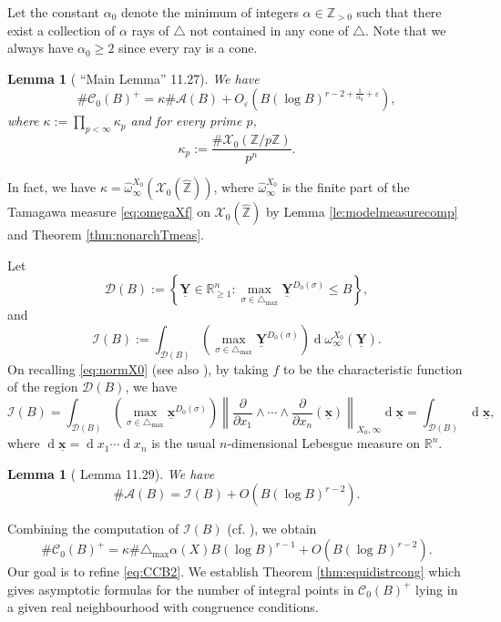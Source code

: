 \documentclass[11pt,letterpaper]{amsart}
\newcommand{\BR}{{\mathbb {R}}}
\newcommand{\BZ}{{\mathbb {Z}}}
\newcommand{\CA}{{\mathcal {A}}}
\newcommand{\CC}{{\mathcal {C}}}
\newcommand{\CD}{{\mathcal {D}}}
\newcommand{\CI}{{\mathcal {I}}}
\newcommand{\CX}{{\mathcal {X}}}
\newcommand{\xx}{\underline{\mathbf{x}}}
\newcommand{\YY}{\underline{\mathbf{Y}}}
\theoremstyle{plain}
\numberwithin{equation}{section}
\newtheorem{lemma}[theorem]{Lemma}
\theoremstyle{definition}
\theoremstyle{remark}
\begin{document}
Let the constant $\alpha_0$ denote the minimum of integers $\alpha\in\BZ_{>0}$ such that there exist a collection of $\alpha$ rays of $\triangle$ not contained in any cone of $\triangle$. Note that we always have $\alpha_0\geqslant 2$ since every ray is a cone.
\begin{lemma}[\cite{Salberger} ``Main Lemma'' 11.27]\label{thm:Salbergermainlemma} We have
$$\#\CC_0(B)^+=\kappa\#\CA(B)+O_\varepsilon(B(\log B)^{r-2+\frac{1}{\alpha_0}+\varepsilon}),$$ where $\kappa:=\prod_{p<\infty}\kappa_p$ and for every prime $p$, \begin{equation}\label{eq:kappa}
	\kappa_p:=\frac{\#\CX_0(\BZ/p\BZ)}{p^n}.
\end{equation} 
\end{lemma}
In fact, we have $\kappa=\widehat{\omega}_{\infty}^{X_0}(\CX_0(\widehat{\BZ}))$, where $\widehat{\omega}_{\infty}^{X_0}$ is the finite part of the Tamagawa measure \eqref{eq:omegaXf} on $\CX_0(\widehat{\BZ})$ by Lemma \ref{le:modelmeasurecomp} and Theorem \ref{thm:nonarchTmeas}.

Let
\begin{equation}\label{eq:CDB}
	\CD(B):=\left\{\YY\in\BR_{\geqslant 1}^n:\max_{\sigma\in\triangle_{\max}}\YY^{D_0(\sigma)}\leqslant B\right\},
\end{equation}
and \begin{equation}\label{eq:CIB}
	\CI(B):=\int_{\CD(B)}\left(\max_{\sigma\in\triangle_{\max}}\YY^{D_0(\sigma)}\right)\operatorname{d}\omega^{X_0}_{\infty}(\YY).
\end{equation}
On recalling \eqref{eq:normX0} (see also  \cite[Proof of Lemma 11.29]{Salberger}), by taking $f$ to be the characteristic function of the region $\CD(B)$, we have
$$\CI(B)=\int_{\CD(B)}\left(\max_{\sigma\in\triangle_{\max}}\xx^{D_0(\sigma)}\right)\left\|\frac{\partial}{\partial x_{1}}\wedge\cdots\wedge\frac{\partial}{\partial x_{n}}(\xx)\right\|_{X_0,\infty}\operatorname{d}\xx=\int_{\CD(B)}\operatorname{d}\xx,$$ where $\operatorname{d}\xx=\operatorname{d}x_1\cdots\operatorname{d}x_n$ is the usual $n$-dimensional Lebesgue measure on $\BR^n$.

\begin{lemma}[\cite{Salberger} Lemma 11.29]\label{le:exchangeABIB}
We have	$$\#\CA(B)=\CI(B)+O(B(\log B)^{r-2}).$$
\end{lemma}
Combining the computation of $\CI(B)$ (cf. \cite[11.42]{Salberger}), we obtain
\begin{equation}\label{eq:CCB2}
	\#\CC_0(B)^+=\kappa\#\triangle_{\max}\alpha(X)B(\log B)^{r-1}+O(B(\log B)^{r-2}).
\end{equation} 
Our goal is to refine \eqref{eq:CCB2}. We establish Theorem \ref{thm:equidistrcong} which gives asymptotic formulas for the number of integral points in $\CC_0(B)^+$ lying in a given real neighbourhood with congruence conditions.
\end{document}
